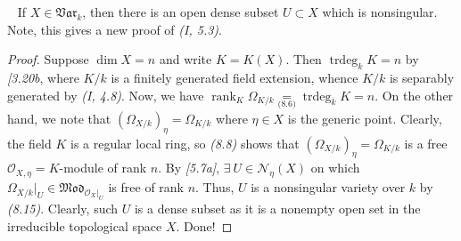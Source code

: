 \documentclass[11pt,a4paper,footinclude=true,headinclude=true]{scrbook} %
\DeclareMathOperator{\trdeg}{trdeg}
\DeclareMathOperator{\rank}{rank}
\newcommand{\NN}{\mathcal{N}}
\newcommand{\OO}{\mathcal{O}}
\newcommand{\Var}{\mathfrak{Var}}
\newcommand{\<}{\langle}
\newcommand{\>}{\rangle}
\newcommand{\MOD}{\mathfrak{Mod}}
\newenvironment{corollary}[2][]
{\renewcommand\theinnercustomcol{#2}\innercustomcol[#1]
\begin{mdframed}[backgroundcolor=gray!20]\ }
{\end{mdframed}\endinnercustomcol}
\begin{document}
\begin{corollary}{8.16}
    If $X\in\Var_k$, then there is an open dense subset $U\subset X$ which is nonsingular. Note, this gives a new proof of \textit{(I, 5.3)}. 
\end{corollary}
\begin{proof}
    Suppose $\dim X=n$ and write $K=K(X)$. Then $\trdeg_kK=n$ by \textit{[3.20b}, where $K/k$ is a finitely generated field extension, whence $K/k$ is separably generated by \textit{(I, 4.8)}. Now, we have $\rank_K\Omega_{K/k}\underset{\textit{(8.6)}}{=}\trdeg_kK=n$. On the other hand, we note that $(\Omega_{X/k})_\eta=\Omega_{K/k}$ where $\eta\in X$ is the generic point. Clearly, the field $K$ is a regular local ring, so \textit{(8.8)} shows that $(\Omega_{X/k})_\eta=\Omega_{K/k}$ is a free $\OO_{X,\eta}=K$-module of rank $n$. By \textit{[5.7a]}, $\exists\ U\in\NN_\eta(X)$ on which $\Omega_{X/k}|_U\in\MOD_{\OO_X|_U}$ is free of rank $n$. Thus, $U$ is a nonsingular variety over $k$ by \textit{(8.15)}. Clearly, such $U$ is a dense subset as it is a nonempty open set in the irreducible topological space $X$. Done!    
\end{proof}
\end{document}
